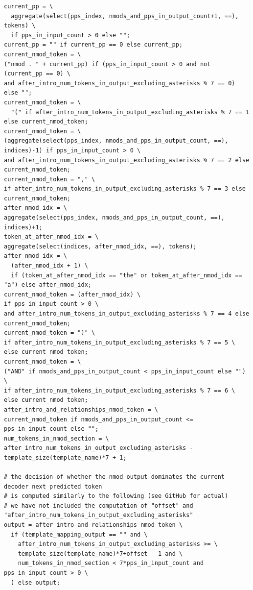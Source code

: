 \documentclass[11pt]{article}
\begin{document}
\begin{tiny}
\begin{verbatim}
current_pp = \
  aggregate(select(pps_index, nmods_and_pps_in_output_count+1, ==), tokens) \
  if pps_in_input_count > 0 else "";
current_pp = "" if current_pp == 0 else current_pp;
current_nmod_token = \
("nmod . " + current_pp) if (pps_in_input_count > 0 and not (current_pp == 0) \
and after_intro_num_tokens_in_output_excluding_asterisks % 7 == 0) else "";
current_nmod_token = \
  "(" if after_intro_num_tokens_in_output_excluding_asterisks % 7 == 1 else current_nmod_token;
current_nmod_token = \
(aggregate(select(pps_index, nmods_and_pps_in_output_count, ==), indices)-1) if pps_in_input_count > 0 \
and after_intro_num_tokens_in_output_excluding_asterisks % 7 == 2 else current_nmod_token;
current_nmod_token = "," \
if after_intro_num_tokens_in_output_excluding_asterisks % 7 == 3 else current_nmod_token;
after_nmod_idx = \
aggregate(select(pps_index, nmods_and_pps_in_output_count, ==), indices)+1;
token_at_after_nmod_idx = \
aggregate(select(indices, after_nmod_idx, ==), tokens);
after_nmod_idx = \
  (after_nmod_idx + 1) \
  if (token_at_after_nmod_idx == "the" or token_at_after_nmod_idx == "a") else after_nmod_idx;
current_nmod_token = (after_nmod_idx) \
if pps_in_input_count > 0 \
and after_intro_num_tokens_in_output_excluding_asterisks % 7 == 4 else current_nmod_token;
current_nmod_token = ")" \
if after_intro_num_tokens_in_output_excluding_asterisks % 7 == 5 \
else current_nmod_token;
current_nmod_token = \
("AND" if nmods_and_pps_in_output_count < pps_in_input_count else "") \
if after_intro_num_tokens_in_output_excluding_asterisks % 7 == 6 \
else current_nmod_token;
after_intro_and_relationships_nmod_token = \
current_nmod_token if nmods_and_pps_in_output_count <= pps_in_input_count else "";
num_tokens_in_nmod_section = \
after_intro_num_tokens_in_output_excluding_asterisks - template_size(template_name)*7 + 1;

# the decision of whether the nmod output dominates the current decoder next predicted token
# is computed similarly to the following (see GitHub for actual)
# we have not included the computation of "offset" and "after_intro_num_tokens_in_output_excluding_asterisks"
output = after_intro_and_relationships_nmod_token \
  if (template_mapping_output == "" and \
    after_intro_num_tokens_in_output_excluding_asterisks >= \
    template_size(template_name)*7+offset - 1 and \
    num_tokens_in_nmod_section < 7*pps_in_input_count and pps_in_input_count > 0 \
  ) else output;

\end{verbatim}
\end{tiny}
\end{document}
